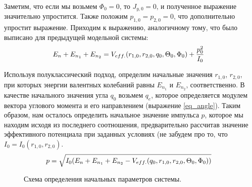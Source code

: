 Заметим, что если мы возьмем $\Phi_0 = 0$, то $J_{y, 0} = 0$, и полученное выражение значительно упростится. Также положим $p_{1,0} = p_{2,0} = 0$, что дополнительно упростит выражение.
Приходим к выражению, аналогичному тому, что было выписано для предыдущей модельной системы:
\vverh
\begin{gather}
E_n + E_{n_1} + E_{n_2} = V_{eff.}(r_{1,0}, r_{2,0}, q_0, \Theta_0, \Phi_0) + \frac{p_0^2}{I_0} \notag
\end{gather}

Используя полуклассический подход, определим начальные значения $r_{1, 0}$, $r_{2, 0}$, при которых энергии валентных колебаний равны $E_{n_1}$ и $E_{n_2}$, соответственно. В качестве начального значения угла $q_0$ возьмем $q_e$, которое определяется модулем вектора углового момента и его направлением (выражение \eqref{eq_angle}). Таким образом, нам осталось определить начальное значение импульса $p$, которое мы находим исходя из последнего соотношения, предварительно рассчитав значение эффективного потенциала при заданных условиях (не забудем про то, что $I_0 = I_0 (r_{1,0}, r_{2,0})$.
\vverh
\begin{gather}
p = \sqrt{I_0 (E_n + E_{n_1} + E_{n_2} - V_{eff.} (q_0, r_{1,0}, r_{2,0}, \Theta_0, \Phi_0))} \notag
\end{gather}

\vverh
\begin{figure}[H]
  \begin{center}
    \caption{Схема определения начальных параметров системы.}
  \end{center}
\end{figure}